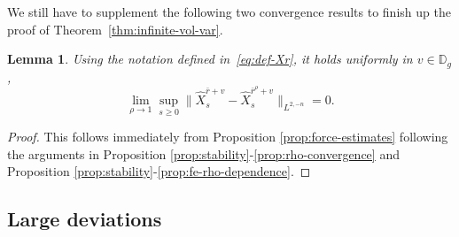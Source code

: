 \documentclass[11pt, a4paper]{scrartcl}
\numberwithin{equation}{section}
\theoremstyle{plain}
\newtheorem{lemma}[foo]{Lemma}
\theoremstyle{remark}
\begin{document}
We still have to supplement the following two convergence results to finish up
the proof of Theorem~\ref{thm:infinite-vol-var}.

\begin{lemma}
  \label{lem:X-rho-convergence}Using the notation defined
  in~\eqref{eq:def-Xr}, it holds uniformly in $v \in \mathbb{D}_g$,
  \[ \lim_{\rho \rightarrow 1} \sup_{s \geqslant 0} \| \hat{X}_s^{\bar{r} + v}
     - \hat{X}_s^{\bar{r}^{\rho} + v} \|_{L^{2, - n}} = 0. \]
\end{lemma}

\begin{proof}
  This follows immediately from Proposition \ref{prop:force-estimates} following the arguments in Proposition
  \ref{prop:stability}-\ref{prop:rho-convergence} and Proposition
  \ref{prop:stability}-\ref{prop:fe-rho-dependence}.
\end{proof}

\subsection{Large deviations}\label{sec:LDP}
\end{document}
